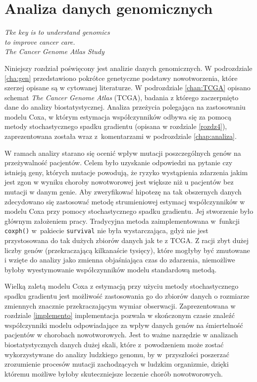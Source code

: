 \chapter{Analiza danych genomicznych}\label{chap5}
\begin{flushright}
\textit{Tke key is to understand genomics \\
to improve cancer care. \\
The Cancer Genome Atlas Study
}
\end{flushright}

Niniejszy rozdział poświęcony jest analizie danych genomicznych. W podrozdziale \ref{cha:gen} przedstawiono pokrótce genetyczne podstawy nowotworzenia, które szerzej opisane są w cytowanej literaturze. W podrozdziale \ref{chan:TCGA} opisano schemat \textit{The Cancer Genome Atlas} (TCGA), badania z którego zaczerpnięto dane do analizy biostatystycznej. Analiza przeżycia polegająca na zastosowaniu modelu Coxa, w którym estymacja współczynników odbywa się za pomocą metody stochastycznego spadku gradientu (opisana w rozdziale \ref{rozdz4}), zaprezentowana została wraz z~komentarzami w podrozdziale \ref{chap:analiza}. 

W ramach analizy starano się ocenić wpływ mutacji poszczególnych genów na przeżywalność pacjentów. Celem było uzyskanie odpowiedzi na pytanie czy istnieją geny, których mutacje powodują, że ryzyko wystąpienia zdarzenia jakim jest zgon w wyniku choroby nowotworowej jest większe niż u pacjentów bez mutacji w danym genie. Aby zweryfikować hipotezę na tak obszernych danych zdecydowano się zastosować metodę strumieniowej estymacj współczynników w modelu Coxa przy pomocy stochastycznego spadku gradientu. Jej stworzenie było głównym założeniem pracy. Tradycyjna metoda zaimplementowana w~funkcji \texttt{coxph()} w~pakiecie \texttt{survival} \citep{survival} nie była wystarczająca, gdyż nie jest przystosowana do tak dużych zbiorów danych jak te z TCGA. Z racji zbyt dużej liczby genów (przekraczającą kilkanaście tysięcy), które mogłyby być zmutowane i wzięte do analizy jako zmienna objaśniająca czas do zdarzenia, niemożliwe byłoby wyestymowanie współczynników modelu standardową metodą.

Wielką zaletą modelu Coxa z estymacją przy użyciu metody stochastycznego spadku gradientu jest możliwość zastosowania go do zbiorów danych o rozmiarze zmiennych znacznie przekraczającym wymiar obserwacji. Zaprezentowana w rozdziale \ref{implemento} implementacja pozwala w skończonym czasie znaleźć współczynniki modelu odpowiadające za wpływ danych genów na śmiertelność pacjentów w chorobach nowotworowych. Jest to ważne narzędzie w analizach biostatystycznych danych dużej skali, które z~powodzeniem może zostać wykorzystywane do analizy ludzkiego genomu, by w~przyszłości poszerzać zrozumienie procesów mutacji zachodzących w ludzkim organizmie, dzięki któremu możliwe byłoby skuteczniejsze leczenie chorób nowotworowych.
\newpage

